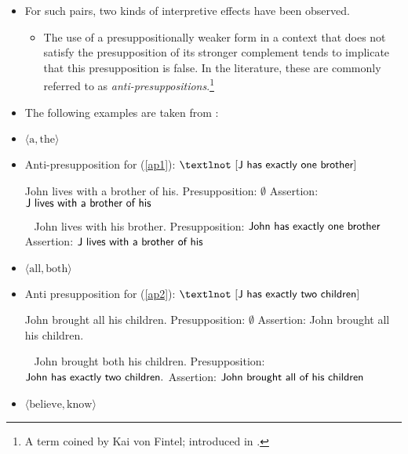 \documentclass[landscape,twocolumn,cronos,paper=letter]{ling-handout}
\begin{document}
\begin{itemize}
        \item For such pairs, two kinds of interpretive effects have been observed.

        \begin{itemize}

            \item The use of a presuppositionally weaker form in a context that
            does not satisfy the presupposition of its stronger complement tends
            to implicate that this presupposition is false. In the literature,
            these are commonly referred to as
            \textit{anti-presuppositions}.\footnote{A term coined by Kai von
            Fintel; introduced in \cite{percus2006antipresuppositions}.}

        \end{itemize}

        \item The following examples are taken from \citet[p.,14]{marty2017}:

        \item $\langle \text{a}, \text{the}\rangle$

        \item Anti-presupposition for (\ref{ap1}): $¬ [\ml{J has exactly one brother}]$

        \pex
        John lives with a brother of his.
        \a\label{ap1}Presupposition: $∅$
        \a Assertion: $\textsf{J lives with a brother of his}$
        \xe

        \pex~
        John lives with his brother.
        \a Presupposition: $\textsf{John has exactly one brother}$
        \a Assertion: $\textsf{J lives with a brother of his}$
        \xe

        \item $\langle\text{all},\text{both}\rangle$

        \item Anti presupposition for (\ref{ap2}): $¬ [\ml{J has exactly two children}]$

        \pex
        John brought all his children.
        \a\label{ap2}Presupposition: $∅$
        \a Assertion: John brought all his children.
        \xe

        \pex~
        John brought both his children.
        \a Presupposition: $\textsf{John has exactly two children.}$
        \a Assertion: $\textsf{John brought all of his children}$
        \xe

        \item $\langle\text{believe},\text{know}\rangle$


\end{itemize}
\end{document}
